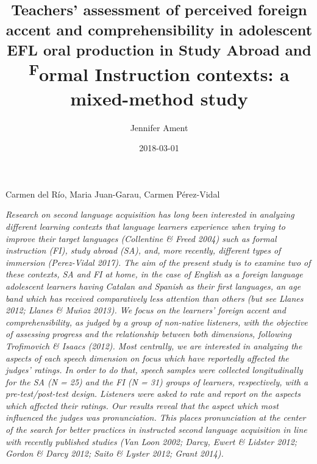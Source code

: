 \documentclass[12pt]{article}
\title{}
\author{Jennifer Ament}
\date{2018-03-01}
\newcommand\textstylespellingerror[1]{#1}
\newenvironment{styleStandard}{\setlength\leftskip{0cm}\setlength\rightskip{0cm plus 1fil}\setlength\parindent{0cm}\setlength\parfillskip{0pt plus 1fil}\setlength\parskip{0in plus 1pt}\writerlistparindent\writerlistleftskip\leavevmode\normalfont\normalsize\writerlistlabel\ignorespaces}{\unskip\vspace{0.111in plus 0.0111in}\par}
\newenvironment{stylelsAbstract}{\setlength\leftskip{0.5in}\setlength\rightskip{0.5in}\setlength\parindent{0in}\setlength\parfillskip{0pt plus 1fil}\setlength\parskip{0in plus 1pt}\writerlistparindent\writerlistleftskip\leavevmode\normalfont\normalsize\itshape\writerlistlabel\ignorespaces}{\unskip\vspace{0.111in plus 0.0111in}\par}
\newcommand\writerlistleftskip{}
\newcommand\writerlistparindent{}
\newcommand\writerlistlabel{}
\begin{document}
\title{\textsuperscript{Teachers’ assessment of perceived foreign accent and comprehensibility in adolescent EFL oral production in Study Abroad and F}ormal Instruction contexts: a mixed-method study}
\maketitle

\begin{styleStandard}
\textstylespellingerror{Carmen del Río, Maria Juan-Garau, Carmen Pérez-Vidal}
\end{styleStandard}

\begin{stylelsAbstract}
Research on second language acquisition has long been interested in analyzing different learning contexts that language learners experience when trying to improve their target languages (Collentine \& Freed 2004) such as formal instruction (FI), study abroad (SA), and, more recently, different types of immersion (Perez-Vidal 2017). The aim of the present study is to examine two of these contexts, SA and FI at home, in the case of English as a foreign language adolescent learners having Catalan and Spanish as their first languages, an age band which has received comparatively less attention than others (but see Llanes 2012; Llanes \& Muñoz 2013). We focus on the learners’ foreign accent and comprehensibility, as judged by a group of non-native listeners, with the objective of assessing progress and the relationship between both dimensions, following Trofimovich \& Isaacs (2012). Most centrally, we are interested in analyzing the aspects of each speech dimension on focus which have reportedly affected the judges’ ratings. In order to do that, speech samples were collected longitudinally for the SA (N = 25) and the FI (N = 31) groups of learners, respectively, with a pre-test/post-test design. Listeners were asked to rate and report on the aspects which affected their ratings. Our results reveal that the aspect which most influenced the judges was pronunciation. This places pronunciation at the center of the search for better practices in instructed second language acquisition in line with recently published studies (Van Loon 2002; Darcy, Ewert \& Lidster 2012; Gordon \& Darcy 2012; Saito \& Lyster 2012; Grant 2014).
\end{stylelsAbstract}
\end{document}
